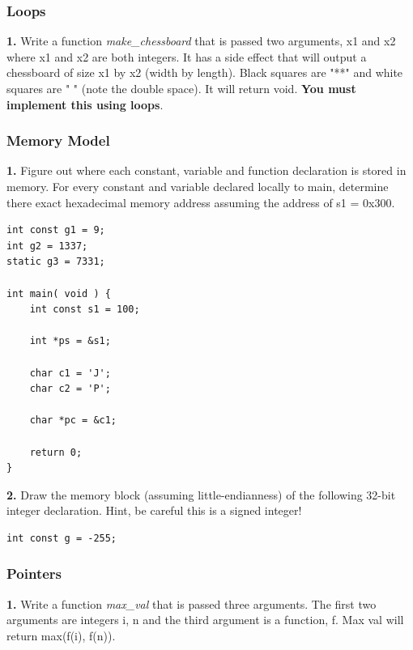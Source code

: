 \documentclass[12pt,extarticle]{article}
\begin{document}
\subsubsection{Loops}

\textbf{1.} Write a function \emph{make\_chessboard} that is passed two arguments, x1 and x2 where x1 and x2 are both integers. It has a side effect that will output a chessboard of size x1 by x2 (width by length). Black squares are "**" and white squares are "  " (note the double space). It will return void. \textbf{You must implement this using loops}.

\subsubsection{Memory Model}

\textbf{1.} Figure out where each constant, variable and function declaration is stored in memory. For every constant and variable declared locally to main, determine there exact hexadecimal memory address assuming the address of s1 = 0x300.\\

\lstset {
	language=c
}
\begin{lstlisting}
int const g1 = 9;
int g2 = 1337;
static g3 = 7331;

int main( void ) {
	int const s1 = 100;
	
	int *ps = &s1;
	
	char c1 = 'J';
	char c2 = 'P';
	
	char *pc = &c1;
	
	return 0;
}
\end{lstlisting}

\noindent
\textbf{2.} Draw the memory block (assuming little-endianness) of the following 32-bit integer declaration. Hint, be careful this is a signed integer!\\

\lstset {
	language=c
}
\begin{lstlisting}
int const g = -255;
\end{lstlisting}

\subsubsection{Pointers}

\textbf{1.} Write a function \emph{max\_val} that is passed three arguments. The first two arguments are integers i, n and the third argument is a function, f. Max val will return max(f(i), f(n)).\\
\end{document}
